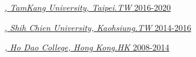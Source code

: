 





\href{https://www.tku.edu.tw/}{, \textit{TamKang University, Taipei.TW}	\hfill 2016-2020}

\href{https://www.usc.edu.tw/}{, \textit{Shih Chien University, Kaohsiung.TW} \hfill 2014-2016}

\href{https://www.hodao.edu.hk/}{, \textit{Ho Dao College, Hong Kong.HK}	\hfill  2008-2014}
